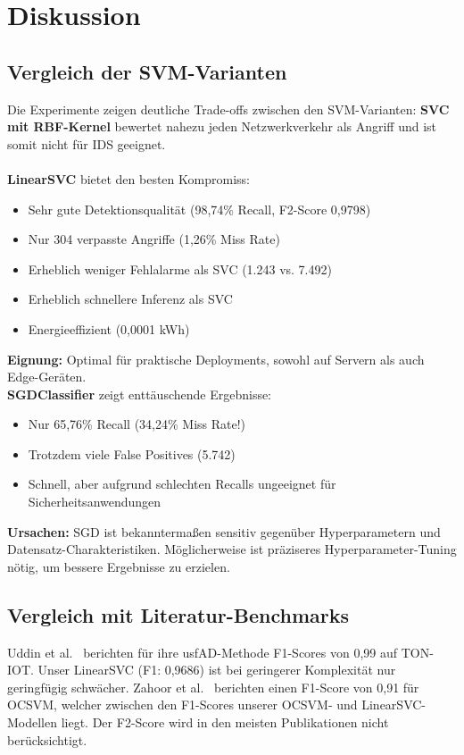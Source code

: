 \documentclass[12pt,oneside]{article}
\begin{document}
	\section{Diskussion}
	\label{sec:discussion}
	\subsection{Vergleich der SVM-Varianten}
	Die Experimente zeigen deutliche Trade-offs zwischen den SVM-Varianten:
	\textbf{SVC mit RBF-Kernel} bewertet nahezu jeden Netzwerkverkehr als Angriff und ist somit nicht für IDS geeignet.\\\\
	\textbf{LinearSVC} bietet den besten Kompromiss:
	\begin{itemize}
		\item Sehr gute Detektionsqualität (98,74\% Recall, F2-Score 0,9798)
		\item Nur 304 verpasste Angriffe (1,26\% Miss Rate)
		\item Erheblich weniger Fehlalarme als SVC (1.243 vs. 7.492)
		\item Erheblich schnellere Inferenz als SVC
		\item Energieeffizient (0,0001 kWh)
	\end{itemize}
	\textbf{Eignung:} Optimal für praktische Deployments, sowohl auf Servern als auch Edge-Geräten.\\
	\textbf{SGDClassifier} zeigt enttäuschende Ergebnisse:
	\begin{itemize}
		\item Nur 65,76\% Recall (34,24\% Miss Rate!)
		\item Trotzdem viele False Positives (5.742)
		\item Schnell, aber aufgrund schlechten Recalls ungeeignet für Sicherheitsanwendungen
	\end{itemize}
	\textbf{Ursachen:} SGD ist bekanntermaßen sensitiv gegenüber Hyperparametern und Datensatz-Charakteristiken. Möglicherweise ist präziseres Hyperparameter-Tuning nötig, um bessere Ergebnisse zu erzielen.
	\subsection{Vergleich mit Literatur-Benchmarks}
	Uddin et al.~\cite{uddin2024} berichten für ihre usfAD-Methode F1-Scores von 0,99 auf TON-IOT. Unser LinearSVC (F1: 0,9686) ist bei geringerer Komplexität nur geringfügig schwächer.
	Zahoor et al.~\cite{zahoor2025} berichten einen F1-Score von 0,91 für OCSVM, welcher zwischen den F1-Scores unserer OCSVM- und LinearSVC-Modellen liegt. Der F2-Score wird in den meisten Publikationen nicht berücksichtigt.
\end{document}
